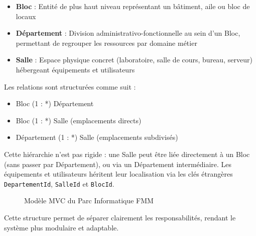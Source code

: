 \begin{itemize}
    \item \textbf{Bloc} : Entité de plus haut niveau représentant un bâtiment, aile ou bloc de locaux
    \item \textbf{Département} : Division administrativo-fonctionnelle au sein d'un Bloc, permettant 
          de regrouper les ressources par domaine métier
    \item \textbf{Salle} : Espace physique concret (laboratoire, salle de cours, bureau, serveur) 
          hébergeant équipements et utilisateurs
\end{itemize}

Les relations sont structurées comme suit :
\begin{itemize}
    \item Bloc (1 : *) Département
    \item Bloc (1 : *) Salle (emplacements directs)
    \item Département (1 : *) Salle (emplacements subdivisés)
\end{itemize}

Cette hiérarchie n'est pas rigide : une Salle peut être liée directement à un Bloc (sans passer par 
Département), ou via un Département intermédiaire. Les équipements et utilisateurs héritent leur 
localisation via les clés étrangères \texttt{DepartementId}, \texttt{SalleId} et \texttt{BlocId}.
\begin{figure}[H]
\centering
\usetikzlibrary{positioning, shapes.geometric, arrows.meta}
\caption{Modèle MVC du Parc Informatique FMM}
\label{fig:mvc_parc_informatique}
\end{figure}
Cette structure permet de séparer clairement les responsabilités, rendant le système plus modulaire et adaptable.
